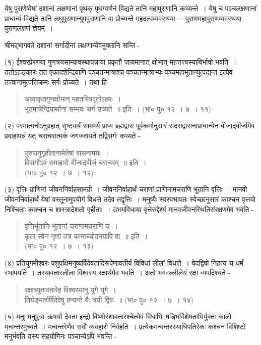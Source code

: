 {येषु पुराणेष्वेषां दशानां लक्षणानां पृथक् पृथग्वर्णनं विद्यते तानि महापुराणानि कथ्यन्ते~। येषु च पञ्चलक्षणानां प्राधान्यं विद्यते तानि लघुपुराणान्युपपुराणानि वा प्रोच्यन्ते महदल्पव्यवस्थया = पुराणमहापुराणव्यवस्थया पुराणलक्षणं ज्ञेयम्~। 

श्रीमद्भागवते दशानां सर्गादीनां लक्षणान्येवमुक्तानि सन्ति -

(१) ईश्वरप्रेरणया गुणत्रयसाम्यावस्थापन्नायां प्रकृतौ जायमानात् क्षोभात् महत्तत्त्वस्याविर्भावो भवति~। ततोऽहङ्कारः तत एकादशेन्द्रियाणि पञ्चतन्मात्राश्च पञ्चतन्मात्राभ्यः पञ्चमहाभूतान्युत्पद्यन्त इत्येवं तत्त्वानामुत्पत्तिक्रमः सर्गः प्रोच्यते~। तथा हि 
\begin{verse}
अव्याकृतगुणक्षोभान् महतस्त्रिवृतोऽहमः~। \\
भूतमात्रेन्द्रियार्थानां सम्भवः सर्ग उच्यते~॥ इति~। (भा० पु० १२~। ७~। ११)
\end{verse}
(२) परमात्मनोऽनुग्रहात् सृष्ट्यर्थं सामर्थ्यं प्राप्य ब्रह्मद्वारा पूर्वकर्मानुसारं सदसद्वासनाप्राधान्येन बीजाद्बीजमिव प्रवाहापन्नं यत् चराचरात्मकं जगज्जायते तद्विसर्गः कथ्यते -
\begin{verse}
पुरुषानुगृहीतानामेतेषां वासनामयः~। \\
विसर्गोऽयं समाहारो बीजाद्बीजं चराचरम्~॥ इति~।\\
\hspace{5cm} (भा० पु० १२~। ७~। १२)
\end{verse}
(३) वृत्तिः प्राणिनां जीवननिर्वाहसामग्री~। जीवननिर्वाहार्थं चराणां प्राणिनामचराणि भूतानि वृत्तिः~। मानवो जीवननिर्वाहार्थं येषां वस्तूनामुपयोगं विधत्ते तदेव तद्वृत्तिः~। मनुष्यैः स्वस्वभावतः स्वेच्छानुसारं काश्चन वृत्तयो निश्चिताः काश्चन च शास्त्रादेशतो गृहीताः~। उभयविधाया वृत्तेरुद्देश्यं मानवजीवनस्थितिसंरक्षणमेव भवति -
\begin{verse}
वृत्तिर्भूतानि भूतानां चराणामचराणि च~। \\
कृता स्वेन नृणां तत्र कामाच्चोदनयापि वा~॥ इति~।\\
\hspace{5cm}(भा० पु० १२~। ७~। १३)
\end{verse}
(४) प्रतियुगमीश्वरः पशुपक्षिमनुष्यर्षिदेवतादिरूपेणावतीर्य विविधां लीलां विधत्ते~। वेदद्विषो निहत्य च धर्मं स्थापयति~। तस्यावतारलीला विश्वस्य रक्षार्थमेव भवति~। अतो भगवल्लीलेयं रक्षा व्यपदिश्यते -
\begin{verse}
रक्षाच्युतावतारेह विश्वस्यानु युगे युगे~। \\
तिर्यङ्मर्त्यर्षिदेवेषु हन्यन्ते यैः त्रयी द्विषः~॥ (भा० पु० १२~। ७~। १४)
\end{verse}
(५) मनुः मनुपुत्रा ऋषयो देवता इन्द्रो विष्णोरंशावतारश्चेत्येवं विधाभिः षड्भिर्विशेषताभिर्युक्तः कालो मन्वन्तरमुच्यते~। मन्वन्तरेणैव सर्वो व्यवहारो निर्वहति~। प्रत्येकमन्वन्तरस्याधिपतिरेकः कश्चन विशिष्टो मनुर्भवति यस्य सहयोगिनः पञ्चान्येऽपि भवन्ति -
}
